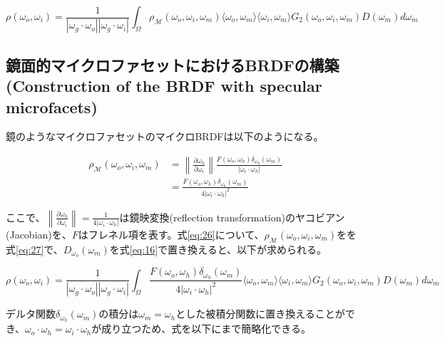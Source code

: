 \documentclass[a4j,xelatex,ja=standard]{bxjsarticle}
\begin{document}
\begin{equation}
    \rho(\omega_o, \omega_i) = \frac{1}{|\omega_g \cdot \omega_o| |\omega_g \cdot \omega_i|} \int_{\Omega} \rho_{\mathcal M}(\omega_o, \omega_i, \omega_m) \langle \omega_o, \omega_m \rangle \langle \omega_i, \omega_m \rangle G_2(\omega_o, \omega_i, \omega_m) D(\omega_m) d\omega_m
    \label{eq:26}
\end{equation}

\subsection{鏡面的マイクロファセットにおけるBRDFの構築(Construction of the BRDF with specular microfacets)}

鏡のようなマイクロファセットのマイクロBRDFは以下のようになる。

\begin{equation}
    \begin{split}
        \rho_{\mathcal M}(\omega_o, \omega_i, \omega_m)
        &= \left\lVert \frac{\partial \omega_h}{\partial \omega_i} \right\rVert \frac{F(\omega_o, \omega_h) \delta_{\omega_h}(\omega_m)}{| \omega_i \cdot \omega_h |} \\
        &= \frac{F(\omega_o, \omega_h) \delta_{\omega_h}(\omega_m)}{4 | \omega_i \cdot \omega_h |^2}
    \end{split}
    \label{eq:27}
\end{equation}

ここで、$\left\lVert \frac{\partial \omega_h}{\partial \omega_i} \right\rVert = \frac{1}{4|\omega_i \cdot \omega_h|}$は鏡映変換(reflection transformation)のヤコビアン(Jacobian)\cite{Walter2007}を、$F$はフレネル項を表す。式\eqref{eq:26}について、$\rho_{\mathcal M}(\omega_o, \omega_i, \omega_m)$をを式\eqref{eq:27}で、$D_{\omega_o}(\omega_m)$を式\eqref{eq:16}で置き換えると、以下が求められる。

\begin{equation}
    \rho(\omega_o, \omega_i) = \frac{1}{|\omega_g \cdot \omega_o| |\omega_g \cdot \omega_i|} \int_{\Omega} \frac{F(\omega_o, \omega_h)\delta_{\omega_h}(\omega_m)}{4|\omega_i \cdot \omega_h|^2} \langle \omega_o, \omega_m \rangle \langle \omega_i, \omega_m \rangle G_2(\omega_o, \omega_i, \omega_m) D(\omega_m) d\omega_m
    \label{eq:28}
\end{equation}

デルタ関数$\delta_{\omega_h}(\omega_m)$の積分は$\omega_m = \omega_h$とした被積分関数に置き換えることができ、$\omega_o \cdot \omega_h = \omega_i \cdot \omega_h$が成り立つため、式を以下にまで簡略化できる。
\end{document}
